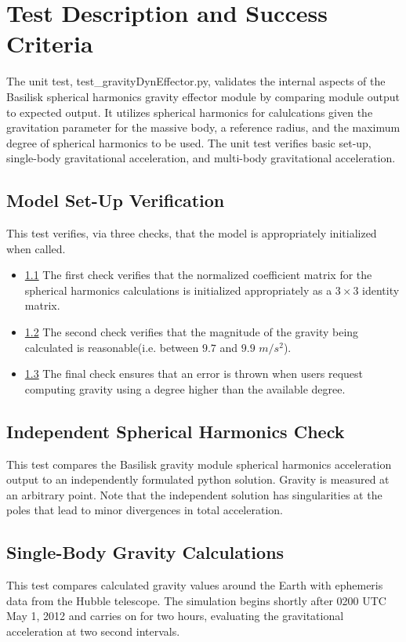 \section{Test Description and Success Criteria}
The unit test, test\_gravityDynEffector.py,  validates the internal aspects of the Basilisk spherical harmonics gravity effector module by comparing module output to expected output. It utilizes spherical harmonics for calulcations given the gravitation parameter for the massive body, a reference radius, and the maximum degree of spherical harmonics to be used. The unit test verifies basic set-up, single-body gravitational acceleration, and multi-body gravitational acceleration.

\subsection{Model Set-Up Verification}
This test verifies, via three checks, that the model is appropriately initialized when called.
		\begin{itemize}
			\item \underline{1.1} The first check verifies that the normalized coefficient matrix for the spherical harmonics calculations is initialized appropriately as a $3\times3$ identity matrix. \\
			\item \underline{1.2} The second check verifies that the magnitude of the gravity being calculated is reasonable(i.e. between $9.7$ and $9.9$ $m/s^2$). \\
			\item \underline{1.3} The final check ensures that an error is thrown when users request computing gravity using a degree higher than the available degree.\\
		\end{itemize}
\subsection{Independent Spherical Harmonics Check} This test compares the Basilisk gravity module spherical harmonics acceleration output to an independently formulated python solution. Gravity is measured at an arbitrary point. Note that the independent solution has singularities at the poles that lead to minor divergences in total acceleration.
\subsection{Single-Body Gravity Calculations} This test compares calculated gravity values around the Earth with ephemeris data from the Hubble telescope. The simulation begins shortly after 0200 UTC May 1, 2012 and carries on for two hours, evaluating the gravitational acceleration at two  second intervals.
